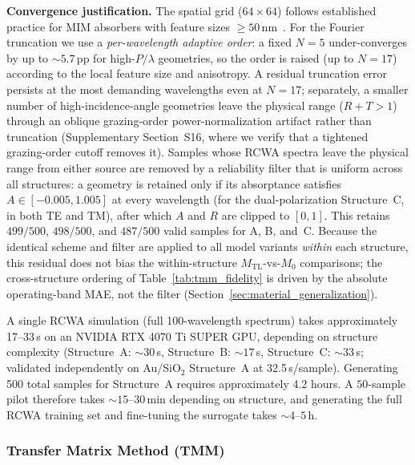 \documentclass[a4paper,fleqn]{cas-sc}
\newcommand{\Mzero}{M_0}
\newcommand{\Mtl}{M_\text{TL}}
\begin{document}
\textbf{Convergence justification.} The spatial grid ($64 \times 64$) follows established practice for MIM absorbers with feature sizes $\geq 50$\,nm~\cite{liu2010infrared}. For the Fourier truncation we use a \emph{per-wavelength adaptive order}: a fixed $N=5$ under-converges by up to ${\sim}5.7$\,pp for high-$P/\lambda$ geometries, so the order is raised (up to $N=17$) according to the local feature size and anisotropy. A residual truncation error persists at the most demanding wavelengths even at $N=17$; separately, a smaller number of high-incidence-angle geometries leave the physical range ($R+T>1$) through an oblique grazing-order power-normalization artifact rather than truncation (Supplementary Section~S16, where we verify that a tightened grazing-order cutoff removes it). Samples whose RCWA spectra leave the physical range from either source are removed by a reliability filter that is uniform across all structures: a geometry is retained only if its absorptance satisfies $A\in[-0.005,1.005]$ at every wavelength (for the dual-polarization Structure~C, in both TE and TM), after which $A$ and $R$ are clipped to $[0,1]$. This retains $499/500$, $498/500$, and $487/500$ valid samples for A, B, and~C. Because the identical scheme and filter are applied to all model variants \emph{within} each structure, this residual does not bias the within-structure $\Mtl$-vs-$\Mzero$ comparisons; the cross-structure ordering of Table~\ref{tab:tmm_fidelity} is driven by the absolute operating-band MAE, not the filter (Section~\ref{sec:material_generalization}).

A single RCWA simulation (full 100-wavelength spectrum) takes approximately 17--33\,s on an NVIDIA RTX 4070 Ti SUPER GPU, depending on structure complexity (Structure~A: ${\sim}30$\,s, Structure~B: ${\sim}17$\,s, Structure~C: ${\sim}33$\,s; validated independently on Au/SiO$_2$ Structure~A at 32.5\,s/sample). Generating 500 total samples for Structure~A requires approximately 4.2 hours. A $50$-sample pilot therefore takes ${\sim}15$--$30$\,min depending on structure, and generating the full RCWA training set and fine-tuning the surrogate takes ${\sim}4$--$5$\,h.

\subsubsection{Transfer Matrix Method (TMM)}
\end{document}
